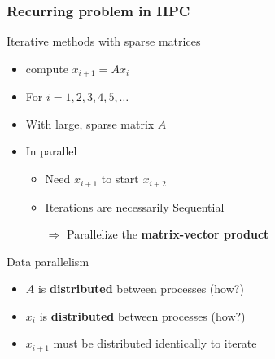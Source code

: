 \documentclass[xcolor={x11names,svgnames},x11names,svgnames]{beamer}
\newcommand{\red}{\alert}
\begin{document}
\begin{frame}
  \frametitle{Recurring problem in HPC}

  \begin{block}{Iterative methods with sparse matrices}
    \begin{itemize}
    \item compute $x_{i+1} = A x_i$
    \item For $i=1, 2, 3,  4, 5, \dots$
    \item With large, sparse matrix $A$
    \item \red{In parallel}
      \begin{itemize}
      \item Need $x_{i+1}$ to start $x_{i+2}$
      \item Iterations are necessarily \red{Sequential} 
      \item[$\Rightarrow$] Parallelize the \textbf{matrix-vector product}
      \end{itemize}
    \end{itemize}
  \end{block}  
  
  \begin{exampleblock}{Data parallelism}
    \begin{itemize}
    \item $A$ is \textbf{distributed} between processes (how?)
    \item $x_i$ is \textbf{distributed} between processes (how?)
    \item $x_{i+1}$ must be distributed \red{identically} to iterate
    \end{itemize}
  \end{exampleblock}
  
\end{frame}

\end{document}
